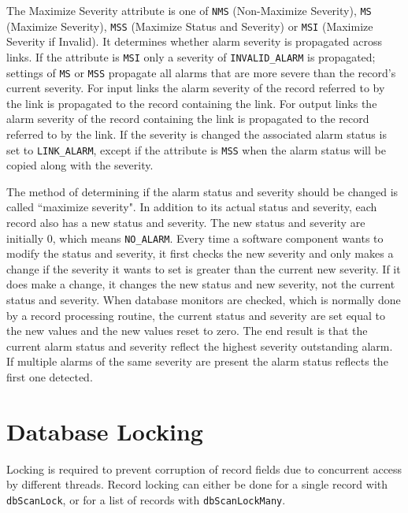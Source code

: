 The Maximize Severity attribute is one of \verb|NMS| (Non-Maximize Severity), \verb|MS| (Maximize Severity),
\verb|MSS| (Maximize Status and Severity) or \verb|MSI| (Maximize Severity if Invalid).
It determines whether alarm severity is propagated across links.
If the attribute is \verb|MSI| only a severity of \verb|INVALID_ALARM| is propagated; settings of \verb|MS| or \verb|MSS|
propagate all alarms that are more severe than the record's current severity.
For input links the alarm severity of the record referred to by the link is propagated to the record containing the link.
For output links the alarm severity of the record containing the link is propagated to the record referred to by the link.
If the severity is changed the associated alarm status is set to \verb|LINK_ALARM|, except if the attribute is \verb|MSS|
when the alarm status will be copied along with the severity.

The method of determining if the alarm status and severity should be changed is called ``maximize severity".
In addition to its actual status and severity, each record also has a new status and severity.
The new status and severity are initially 0, which means \verb|NO_ALARM|.
Every time a software component wants to modify the status and severity, it first checks the new severity and only makes a
change if the severity it wants to set is greater than the current new severity.
If it does make a change, it changes the new status and new severity, not the current status and severity.
When database monitors are checked, which is normally done by a record processing routine, the current status and severity
are set equal to the new values and the new values reset to zero.
The end result is that the current alarm status and severity reflect the highest severity outstanding alarm.
If multiple alarms of the same severity are present the alarm status reflects the first one detected.

\section{Database Locking}
\label{chap:Database Locking}

Locking is required to prevent corruption of record fields due to concurrent access by different threads.
Record locking can either be done for a single record with \verb|dbScanLock|,
or for a list of records with \verb|dbScanLockMany|.

